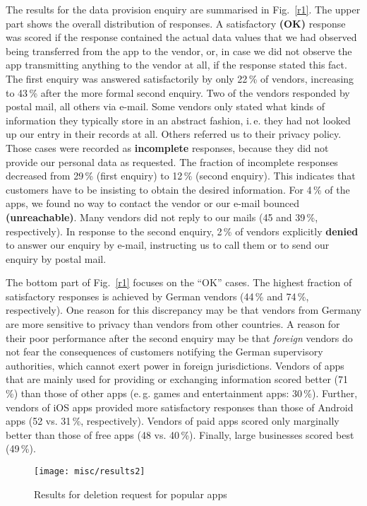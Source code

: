 \documentclass{llncs}
\begin{document}
The results for the data provision enquiry are summarised in Fig.~\ref{r1}. The upper part shows the overall distribution of responses. A satisfactory \textbf{(OK)} response was scored if the response contained the actual data values that we had observed being transferred from the app to the vendor, or, in case we did not observe the app transmitting anything to the vendor at all, if the response stated this fact. The first enquiry was answered satisfactorily by only 22\,\% of vendors, increasing to 43\,\% after the more formal second enquiry. Two of the vendors responded by postal mail, all others via e-mail.
Some vendors only stated what kinds of information they typically store in an abstract fashion, i.\,e. they had not looked up our entry in their records at all. Others referred us to their privacy policy. Those cases were recorded as \textbf{incomplete} responses, because they did not provide our personal data as requested. The fraction of incomplete responses decreased from 29\,\% (first enquiry) to 12\,\% (second enquiry). This indicates that customers have to be insisting to obtain the desired information. For 4\,\% of the apps, we found no way to contact the vendor or our e-mail bounced \textbf{(unreachable)}. Many vendors did not reply to our mails (45 and 39\,\%, respectively). In response to the second enquiry, 2\,\% of vendors explicitly \textbf{denied} to answer our enquiry by e-mail, instructing us to call them or to send our enquiry by postal mail.

The bottom part of Fig.~\ref{r1} focuses on the ``OK'' cases. The highest fraction of satisfactory responses is achieved by German vendors (44\,\% and 74\,\%, respectively). One reason for this discrepancy may be that vendors from Germany are more sensitive to privacy than vendors from other countries. A reason for their poor performance after the second enquiry may be that \emph{foreign} vendors do not fear the consequences of customers notifying the German supervisory authorities, which cannot exert power in foreign jurisdictions.
Vendors of apps that are mainly used for providing or exchanging information scored better (71\,\%) than those of other apps (e.\,g. games and entertainment apps: 30\,\%). Further, vendors of iOS apps provided more satisfactory responses than those of Android apps (52 vs. 31\,\%, respectively). Vendors of paid apps scored only marginally better than those of free apps (48 vs. 40\,\%). Finally, large businesses scored best (49\,\%). 


\begin{figure}[t]
\centering
 \texttt{[image: misc/results2]}
 \caption{\label{r2}Results for deletion request for popular apps}
\end{figure}
\end{document}
